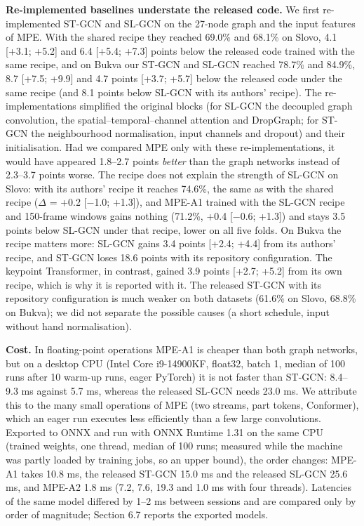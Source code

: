 \textbf{Re-implemented baselines understate the released code.} We first re-implemented ST-GCN and SL-GCN on the 27-node graph and the input features of MPE. With the shared recipe they reached 69.0\% and 68.1\% on Slovo, 4.1 {[}+3.1; +5.2{]} and 6.4 {[}+5.4; +7.3{]} points below the released code trained with the same recipe, and on Bukva our ST-GCN and SL-GCN reached 78.7\% and 84.9\%, 8.7 {[}+7.5; +9.9{]} and 4.7 points {[}+3.7; +5.7{]} below the released code under the same recipe (and 8.1 points below SL-GCN with its authors' recipe). The re-implementations simplified the original blocks (for SL-GCN the decoupled graph convolution, the spatial--temporal--channel attention and DropGraph; for ST-GCN the neighbourhood normalisation, input channels and dropout) and their initialisation. Had we compared MPE only with these re-implementations, it would have appeared 1.8--2.7 points \emph{better} than the graph networks instead of 2.3--3.7 points worse. The recipe does not explain the strength of SL-GCN on Slovo: with its authors' recipe it reaches 74.6\%, the same as with the shared recipe (\(\Delta\) = +0.2 {[}−1.0; +1.3{]}), and MPE-A1 trained with the SL-GCN recipe and 150-frame windows gains nothing (71.2\%, +0.4 {[}−0.6; +1.3{]}) and stays 3.5 points below SL-GCN under that recipe, lower on all five folds. On Bukva the recipe matters more: SL-GCN gains 3.4 points {[}+2.4; +4.4{]} from its authors' recipe, and ST-GCN loses 18.6 points with its repository configuration. The keypoint Transformer, in contrast, gained 3.9 points {[}+2.7; +5.2{]} from its own recipe, which is why it is reported with it. The released ST-GCN with its repository configuration is much weaker on both datasets (61.6\% on Slovo, 68.8\% on Bukva); we did not separate the possible causes (a short schedule, input without hand normalisation).

\textbf{Cost.} In floating-point operations MPE-A1 is cheaper than both graph networks, but on a desktop CPU (Intel Core i9-14900KF, float32, batch 1, median of 100 runs after 10 warm-up runs, eager PyTorch) it is not faster than ST-GCN: 8.4--9.3 ms against 5.7 ms, whereas the released SL-GCN needs 23.0 ms. We attribute this to the many small operations of MPE (two streams, part tokens, Conformer), which an eager run executes less efficiently than a few large convolutions. Exported to ONNX and run with ONNX Runtime 1.31 on the same CPU (trained weights, one thread, median of 100 runs; measured while the machine was partly loaded by training jobs, so an upper bound), the order changes: MPE-A1 takes 10.8 ms, the released ST-GCN 15.0 ms and the released SL-GCN 25.6 ms, and MPE-A2 1.8 ms (7.2, 7.6, 19.3 and 1.0 ms with four threads). Latencies of the same model differed by 1--2 ms between sessions and are compared only by order of magnitude; Section 6.7 reports the exported models.

